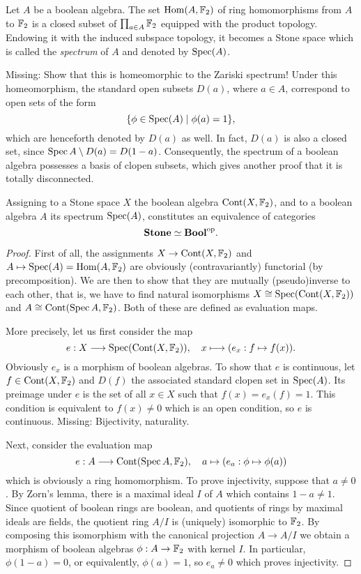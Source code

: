 \documentclass{notes}
\begin{document}
{\begin{example}
  Let \(A\) be a boolean algebra.
  The set \(\mathrm{Hom}(A,{\mathbb{F}}_2)\) of ring homomorphisms from \(A\) to \({\mathbb{F}}_2\) is a closed subset of \(\prod_{a\in A}{\mathbb{F}}_2\) equipped with the product topology.
  Endowing it with the induced subspace topology, it becomes a Stone space which is called the \emph{spectrum} of \(A\) and denoted by \(\operatorname{Spec}(A)\).

  Missing: Show that this is homeomorphic to the Zariski spectrum!
  Under this homeomorphism, the standard open subsets \(D(a)\), where \(a\in A\), correspond to open sets of the form
  \[\{\phi\in\operatorname{Spec}(A) \mid \phi(a)=1\},\]
  which are henceforth denoted by \(D(a)\) as well.
  In fact, \(D(a)\) is also a closed set, since \(\operatorname{Spec} A\setminus D(a)=D(1-a)\).
  Consequently, the spectrum of a boolean algebra possesses a basis of clopen subsets, which gives another proof that it is totally disconnected.
\end{example}

\begin{thm}
  Assigning to a Stone space \(X\) the boolean algebra \({\rm Cont}(X,{\mathbb{F}}_2)\), and to a boolean algebra \(A\) its spectrum \(\operatorname{Spec}(A)\), constitutes an equivalence of categories
  \[
    \mathbf{Stone} \simeq \mathbf{Bool}^{\rm op}.
  \]
\end{thm}
\begin{proof}
  First of all, the assignments \(X\to{\rm Cont}(X,{\mathbb{F}}_2)\) and \(A\mapsto\operatorname{Spec}(A)=\mathrm{Hom}(A,{\mathbb{F}}_2)\) are obviously (contravariantly) functorial (by precomposition).
  We are then to show that they are mutually (pseudo)inverse to each other, that is, we have to find natural isomorphisms \(X\cong\operatorname{Spec}({\rm Cont}(X,{\mathbb{F}}_2))\) and \(A\cong{\rm Cont}(\operatorname{Spec} A,{\mathbb{F}}_2)\).
  Both of these are defined as evaluation maps.

  More precisely, let us first consider the map
  \[e:X \longrightarrow \operatorname{Spec}({\rm Cont}(X,{\mathbb{F}}_2)), \quad x \longmapsto (e_x:f \mapsto f(x)).\]
  Obviously \(e_x\) is a morphism of boolean algebras.
  To show that \(e\) is continuous, let \(f\in {\rm Cont}(X,{\mathbb{F}}_2)\) and \(D(f)\) the associated standard clopen set in \(\operatorname{Spec}(A)\).
  Its preimage under \(e\) is the set of all \(x\in X\) such that \(f(x)=e_x(f)=1\).
  This condition is equivalent to \(f(x)\neq 0\) which is an open condition, so \(e\) is continuous.
  Missing: Bijectivity, naturality.

  Next, consider the evaluation map
  \[e:A \longrightarrow  {\rm Cont}(\operatorname{Spec} A,{\mathbb{F}}_2),\quad a\mapsto (e_a : \phi\mapsto \phi(a))\]
  which is obviously a ring homomorphism.
  To prove injectivity, suppose that \(a\neq 0\).
  By Zorn's lemma, there is a maximal ideal \(I\) of \(A\) which contains \(1-a\neq 1\).
  Since quotient of boolean rings are boolean, and quotients of rings by maximal ideals are fields, the quotient ring \(A/I\) is (uniquely) isomorphic to \({\mathbb{F}}_2\).
  By composing this isomorphism with the canonical projection \(A\to A/I\) we obtain a morphism of boolean algebras \(\phi:A\to {\mathbb{F}}_2\) with kernel \(I\).
  In particular, \(\phi(1-a)=0\), or equivalently, \(\phi(a)=1\), so \(e_a\neq 0\) which proves injectivity.


\end{proof}}
\end{document}
